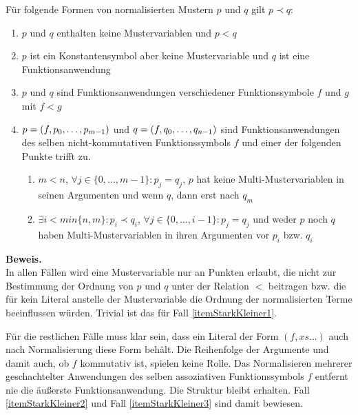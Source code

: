 \begin{lemma} \label{lemStarkKleinerFaelle}
Für folgende Formen von normalisierten Mustern $p$ und $q$ gilt $p \prec q$:
\begin{enumerate}
	\item{$p$ und $q$ enthalten keine Mustervariablen und $p < q$} \label{itemStarkKleiner1}
	
	\item{$p$ ist ein Konstantensymbol aber keine Mustervariable und $q$ ist eine Funktionsanwendung}  \label{itemStarkKleiner2}
	
	\item{$p$ und $q$ sind Funktionsanwendungen verschiedener Funktionssymbole $f$ und $g$ mit $f < g$}  \label{itemStarkKleiner3}
		
	\item{$p = (f, {p}_{0}, \dots, {p}_{m-1})$ und $q = (f, {q}_{0}, \dots, {q}_{n-1})$ sind Funktionsanwendungen des selben nicht-kommutativen Funktionssymbols $f$ und einer der folgenden Punkte trifft zu.
	\begin{enumerate}
		\item{$m < n$, $\forall j \in \{0, \dots, m-1\} \colon p_j = q_j$, $p$ hat keine Multi-Mustervariablen in seinen Argumenten und wenn $q$, dann erst nach $q_m$}
		\item{$\exists i < min\{n, m\} \colon p_i \prec q_i$, $\forall j \in \{0, \dots, i  - 1\} \colon p_j = q_j$ und weder $p$ noch $q$ haben Multi-Mustervariablen in ihren Argumenten vor $p_i$ bzw. $q_i$}
	\end{enumerate}
	} \label{itemStarkKleiner4}
	
\end{enumerate}
\end{lemma}

\textbf{Beweis.}~\\
In allen Fällen wird eine Mustervariable nur an Punkten erlaubt, die nicht zur Bestimmung der Ordnung von $p$ und $q$ unter der Relation $<$ beitragen bzw. die für kein Literal anstelle der Mustervariable die Ordnung der normalisierten Terme beeinflussen würden. Trivial ist das für Fall \ref{itemStarkKleiner1}.

Für die restlichen Fälle muss klar sein, dass ein Literal der Form $(f, xs...)$ auch nach Normalisierung diese Form behält. Die Reihenfolge der Argumente und damit auch, ob $f$ kommutativ ist, spielen keine Rolle. Das Normalisieren mehrerer geschachtelter Anwendungen des selben assoziativen Funktionssymbols $f$ entfernt nie die äußerste Funktionsanwendung. Die Struktur bleibt erhalten.
Fall \ref{itemStarkKleiner2} und Fall \ref{itemStarkKleiner3} sind damit bewiesen.

